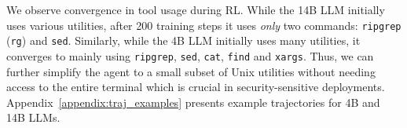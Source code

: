 We observe convergence in tool usage during RL. While the 14B LLM initially uses various utilities, after 200 training steps it uses \emph{only} two commands: \texttt{ripgrep} (\texttt{rg}) and \texttt{sed}. Similarly, while the 4B LLM initially uses many utilities, it converges to mainly using \texttt{ripgrep}, \texttt{sed}, \texttt{cat}, \texttt{find} and \texttt{xargs}. Thus, we can further simplify the agent to a small subset of Unix utilities without needing access to the entire terminal which is crucial in security-sensitive deployments. Appendix~\ref{appendix:traj_examples} presents example trajectories for 4B and 14B LLMs. 

